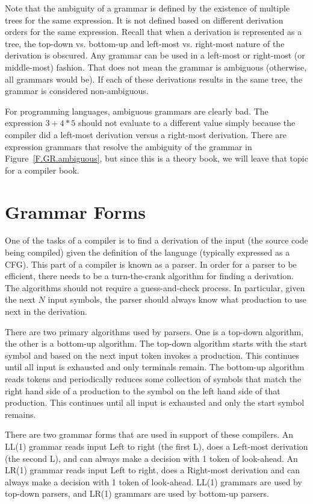 \documentclass[letterpaper,12pt,openany,reqno]{book}%
\begin{document}
Note that the ambiguity of a grammar is defined by the existence of multiple trees for the same expression. It is not defined based on different derivation orders for the same expression. Recall that when a derivation is represented as a tree, the top-down vs. bottom-up and left-most vs. right-most nature of the derivation is obscured. Any grammar can be used in a left-most or right-most (or middle-most) fashion. That does not mean the grammar is ambiguous (otherwise, all grammars would be). If each of these derivations results in the same tree, the grammar is considered non-ambiguous.

For programming languages, ambiguous grammars are clearly bad. The expression $3+4*5$ should not evaluate to a different value simply because the compiler did a left-most derivation versus a right-most derivation. There are expression grammars that resolve the ambiguity of the grammar in Figure~\ref{F.GR.ambiguous}, but since this is a theory book, we will leave that topic for a compiler book.

\section {Grammar Forms}
One of the tasks of a compiler is to find a derivation of the input (the source code being compiled) given the definition of the language (typically expressed as a CFG). This part of a compiler is known as a parser. In order for a parser to be efficient, there needs to be a turn-the-crank algorithm for finding a derivation. The algorithms should not require a guess-and-check process. In particular, given the next $N$ input symbols, the parser should always know what production to use next in the derivation.

There are two primary algorithms used by parsers. One is a top-down algorithm, the other is a bottom-up algorithm. The top-down algorithm starts with the start symbol and based on the next input token invokes a production. This continues until all input is exhausted and only terminals remain. The bottom-up algorithm reads tokens and periodically reduces some collection of symbols that match the right hand side of a production to the symbol on the left hand side of that production. This continues until all input is exhausted and only the start symbol remains.

There are two grammar forms that are used in support of these compilers. An LL(1) grammar reads input Left to right (the first L), does a Left-most derivation (the second L), and can always make a decision with 1 token of look-ahead. An LR(1) grammar reads input Left to right, does a Right-most derivation and can always make a decision with 1 token of look-ahead. LL(1) grammars are used by top-down parsers, and LR(1) grammars are used by bottom-up parsers.
\end{document}
